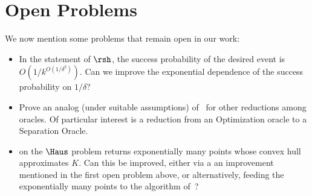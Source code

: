 \section{Open Problems}
\label{sec:open}
We now mention some problems that remain open in our work:
\begin{itemize}
    \item[(i)] In the statement of $\rsh$,
    the success probability of the desired event is $O\left(1/k^{O(1/\delta^2)}\right)$. Can we 
    improve the exponential dependence of the success probability on $1/\delta$?
\item[(ii)] Prove an analog (under suitable assumptions) of~ for other reductions among oracles. Of particular interest is a reduction from an Optimization oracle to a Separation Oracle.
\item[(iii)] on the $\Haus$ problem returns exponentially many points whose convex hull approximates $K$. Can this be improved, either via a an improvement mentioned in the first open problem above, or alternatively, feeding the exponentially many points to the algorithm of~\cite{BlumHR19}? 
\end{itemize}

